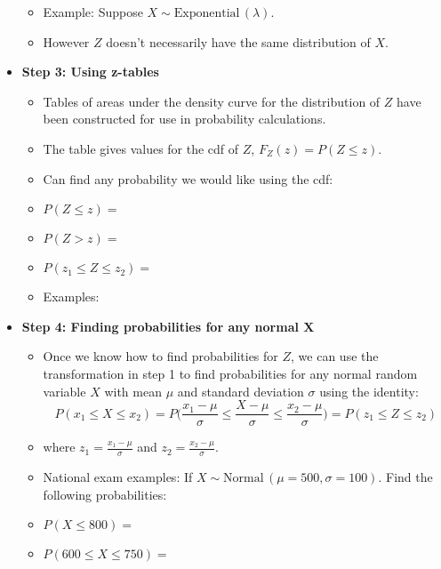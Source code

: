 \documentclass{article}
\newcommand{\follow}[1]{\sim \text{#1}\,}		%
\begin{document}
\begin{itemize}
\begin{itemize}
        \item Example: Suppose $X \follow{Exponential}(\lambda)$.\vspace{50pt}
        \item[] However $Z$ doesn't necessarily have the same distribution of $X$.
    \end{itemize}\bigskip
    \item \textbf{Step 3: Using z-tables}\bigskip
    \begin{itemize}
        \item Tables of areas under the density curve for the distribution of $Z$ have been constructed for use in probability calculations.
        \item The table gives values for the cdf of $Z$, $F_Z(z) = P(Z \le z)$.
        \item Can find any probability we would like using the cdf:
        \item[] $P(Z \le z) = $\vspace{20pt}
        \item[] $P(Z > z) = $\vspace{20pt}
        \item[] $P(z_1 \le Z \le z_2) = $\vspace{40pt}
        \item Examples:\vspace{40pt}
    \end{itemize}\bigskip
    \item \textbf{Step 4: Finding probabilities for any normal $\boldsymbol{X}$}\bigskip
    \begin{itemize}
        \item Once we know how to find probabilities for $Z$, we can use the transformation in step 1 to find probabilities for any normal random variable $X$ with mean $\mu$ and standard deviation $\sigma$ using the identity:
        \[P(x_1 \le X \le x_2) = P\Big(\frac{x_1 - \mu}{\sigma} \le \frac{X - \mu}{\sigma} \le \frac{x_2 - \mu}{\sigma}\Big) = P(z_1 \le Z \le z_2)\]
        \item[] where $\displaystyle z_1 = \frac{x_1 - \mu}{\sigma}$ and $\displaystyle z_2 = \frac{x_2 - \mu}{\sigma}$.
        \item National exam examples: If $X \follow{Normal}(\mu = 500, \sigma = 100)$. Find the following probabilities:
        \item[] $P(X \le 800) = $\vspace{60pt}
        \item[] $P(600 \le X \le 750) = $\vspace{60pt}
    \end{itemize}\bigskip
\end{itemize}\bigskip
\end{document}
